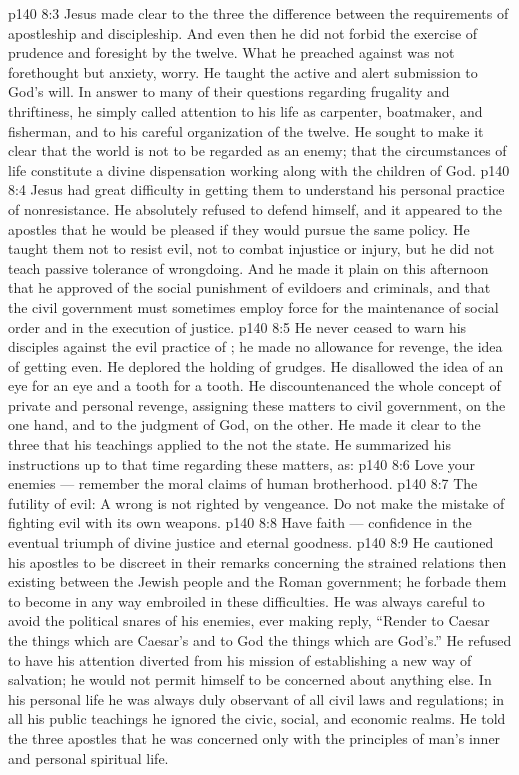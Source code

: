 \vs p140 8:3 Jesus made clear to the three the difference between the requirements of apostleship and discipleship. And even then he did not forbid the exercise of prudence and foresight by the twelve. What he preached against was not forethought but anxiety, worry. He taught the active and alert submission to God’s will. In answer to many of their questions regarding frugality and thriftiness, he simply called attention to his life as carpenter, boatmaker, and fisherman, and to his careful organization of the twelve. He sought to make it clear that the world is not to be regarded as an enemy; that the circumstances of life constitute a divine dispensation working along with the children of God.
\vs p140 8:4 Jesus had great difficulty in getting them to understand his personal practice of nonresistance. He absolutely refused to defend himself, and it appeared to the apostles that he would be pleased if they would pursue the same policy. He taught them not to resist evil, not to combat injustice or injury, but he did not teach passive tolerance of wrongdoing. And he made it plain on this afternoon that he approved of the social punishment of evildoers and criminals, and that the civil government must sometimes employ force for the maintenance of social order and in the execution of justice.
\vs p140 8:5 He never ceased to warn his disciples against the evil practice of ; he made no allowance for revenge, the idea of getting even. He deplored the holding of grudges. He disallowed the idea of an eye for an eye and a tooth for a tooth. He discountenanced the whole concept of private and personal revenge, assigning these matters to civil government, on the one hand, and to the judgment of God, on the other. He made it clear to the three that his teachings applied to the  not the state. He summarized his instructions up to that time regarding these matters, as:
\vs p140 8:6 Love your enemies --- remember the moral claims of human brotherhood.
\vs p140 8:7 The futility of evil: A wrong is not righted by vengeance. Do not make the mistake of fighting evil with its own weapons.
\vs p140 8:8 Have faith --- confidence in the eventual triumph of divine justice and eternal goodness.
\vs p140 8:9 \pc {}\bibnobreakspace {} He cautioned his apostles to be discreet in their remarks concerning the strained relations then existing between the Jewish people and the Roman government; he forbade them to become in any way embroiled in these difficulties. He was always careful to avoid the political snares of his enemies, ever making reply, \textcolor{ubdarkred}{“Render to Caesar the things which are Caesar’s and to God the things which are God’s.”} He refused to have his attention diverted from his mission of establishing a new way of salvation; he would not permit himself to be concerned about anything else. In his personal life he was always duly observant of all civil laws and regulations; in all his public teachings he ignored the civic, social, and economic realms. He told the three apostles that he was concerned only with the principles of man’s inner and personal spiritual life.
